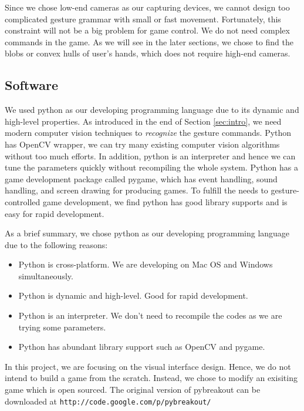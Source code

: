\documentclass[10pt,twocolumn,letterpaper]{article}
\begin{document}
Since we chose low-end cameras as our capturing devices, we cannot design too 
complicated gesture grammar with small or fast movement. Fortunately, this 
constraint will not be a big problem for game control. We do not need complex 
commands in the game. As we will see in the later sections, we chose to find the 
blobs or convex hulls of user's hands, which does not require high-end cameras. 

\subsection{Software}
We used python as our developing programming language due to 
its dynamic and high-level properties. As introduced in the end 
of Section \ref{sec:intro}, we need modern computer vision 
techniques to \emph{recognize} the gesture commands. 
Python has OpenCV wrapper, we can try many existing computer vision 
algorithms without too much efforts. In addition, python 
is an interpreter and hence we can tune 
the parameters quickly without recompiling the whole system. 
Python has a game development package called pygame, which 
has event handling, sound handling, and screen drawing for producing 
games. To fulfill the needs to gesture-controlled game development, 
we find python has good library supports and is easy for rapid development.

As a brief summary, we chose python as our developing programming 
language due to the following reasons:
\begin{itemize}
	\item Python is cross-platform. We are developing on Mac OS and Windows simultaneously.
	\item Python is dynamic and high-level. Good for rapid development.
	\item Python is an interpreter. We don't need to recompile the codes as we are trying some parameters.
	\item Python has abundant library support such as OpenCV and pygame. 
\end{itemize}

In this project, we are focusing on the visual interface 
design. Hence, we do not intend to build a game from the scratch. 
Instead, we chose to modify an exisiting game which is open sourced. 
The original version of pybreakout can be downloaded at
\verb"http://code.google.com/p/pybreakout/"
\end{document}
